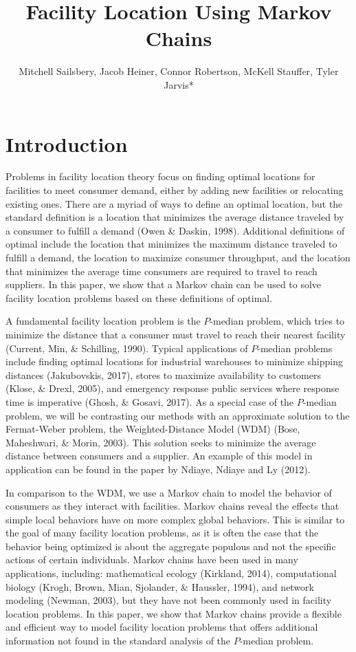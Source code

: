 \documentclass[twoside,twocolumn]{article}
\title{Facility Location Using Markov Chains}
\author{Mitchell Sailsbery, Jacob Heiner, Connor Robertson, McKell Stauffer, Tyler Jarvis*}
\begin{document}
\maketitle

\section{Introduction}

Problems in facility location theory focus on finding optimal locations for facilities to meet consumer demand, either by adding new facilities or relocating existing ones.
There are a myriad of ways to define an optimal location, but the standard definition is a location that minimizes the average distance traveled by a consumer to fulfill a demand (Owen \& Daskin, 1998).
Additional definitions of optimal include the location that minimizes the maximum distance traveled to fulfill a demand, the location to maximize consumer throughput, and the location that minimizes the average time consumers are required to travel to reach suppliers.
In this paper, we show that a Markov chain can be used to solve facility location problems based on these definitions of optimal.

A fundamental facility location problem is the $P$-median problem, which tries to minimize the distance that a consumer must travel to reach their nearest facility (Current, Min, \& Schilling, 1990).
Typical applications of $P$-median problems include finding optimal locations for industrial warehouses to minimize shipping distances (Jakubovskis, 2017), stores to maximize availability to customers (Klose, \& Drexl, 2005), and emergency response public services where response time is imperative (Ghosh, \& Gosavi, 2017).
As a special case of the $P$-median problem, we will be contrasting our methods with an approximate solution to the Fermat-Weber problem, the Weighted-Distance Model (WDM) (Bose, Maheshwari, \& Morin, 2003).
This solution seeks to minimize the average distance between consumers and a supplier.
An example of this model in application can be found in the paper by Ndiaye, Ndiaye and Ly (2012).

In comparison to the WDM, we use a Markov chain to model the behavior of consumers as they interact with facilities. 
Markov chains reveal the effects that simple local behaviors have on more complex global behaviors.
This is similar to the goal of many facility location problems, as it is often the case that the behavior being optimized is about the aggregate populous and not the specific actions of certain individuals.
Markov chains have been used in many applications, including: mathematical ecology (Kirkland, 2014), computational biology (Krogh, Brown, Mian, Sjolander, \& Haussler, 1994), and network modeling (Newman, 2003), but they have not been commonly used in facility location problems.
In this paper, we show that Markov chains provide a flexible and efficient way to model facility location problems that offers additional information not found in the standard analysis of the $P$-median problem.
\end{document}
